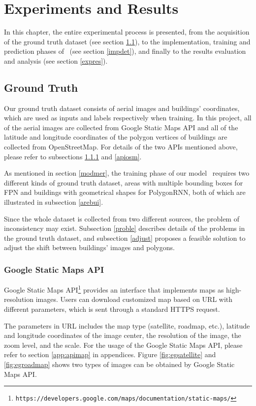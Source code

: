 \chapter{Experiments and Results}\label{exres}
In this chapter, the entire experimental process is presented, from the acquisition of the ground truth dataset (see section \ref{gt}), to the implementation, training and prediction phases of \modelnameshort\ (see section \ref{impdet}), and finally to the results evaluation and analysis (see section \ref{expres}).

\section{Ground Truth}\label{gt}
Our ground truth dataset consists of aerial images and buildings' coordinates, which are used as inputs and labels respectively when training. In this project, all of the aerial images are collected from Google Static Maps API and all of the latitude and longitude coordinates of the polygon vertices of buildings are collected from OpenStreetMap. For details of the two APIs mentioned above, please refer to subsections \ref{apimap} and \ref{apiosm}.

As mentioned in section \ref{modmer}, the training phase of our model \modelnameshort\ requires two different kinds of ground truth dataset, areas with multiple bounding boxes for FPN and buildings with geometrical shapes for PolygonRNN, both of which are illustrated in subsection \ref{arebui}.

Since the whole dataset is collected from two different sources, the problem of inconsistency may exist. Subsection \ref{proble} describes details of the problems in the ground truth dataset, and subsection \ref{adjust} proposes a feasible solution to adjust the shift between buildings' images and polygons.

\subsection{Google Static Maps API}\label{apimap}

Google Static Maps API\footnote{\lstinline{https://developers.google.com/maps/documentation/static-maps/}} provides an interface that implements maps as high-resolution images. Users can download customized map based on URL with different parameters, which is sent through a standard HTTPS request.

The parameters in URL includes the map type (satellite, roadmap, etc.), latitude and longitude coordinates of the image center, the resolution of the image, the zoom level, and the scale. For the usage of the Google Static Maps API, please refer to section \ref{app:apimap} in appendices. Figure \ref{fig:egsatellite} and \ref{fig:egroadmap} shows two types of images can be obtained by Google Static Maps API.

